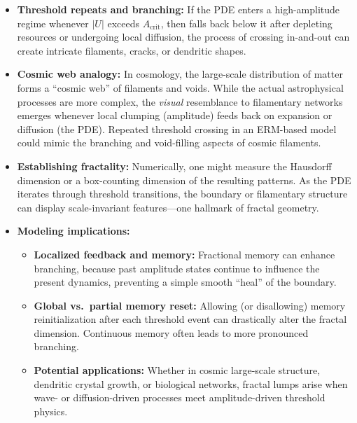 \documentclass[12pt]{article}
\begin{document}
\begin{itemize}
    \item \textbf{Threshold repeats and branching:}
    If the PDE enters a high-amplitude regime whenever $|U|$ exceeds 
    $A_{\mathrm{crit}}$, then falls back below it after depleting resources 
    or undergoing local diffusion, the process of crossing in-and-out can 
    create intricate filaments, cracks, or dendritic shapes.

    \item \textbf{Cosmic web analogy:}
    In cosmology, the large-scale distribution of matter forms a “cosmic web” 
    of filaments and voids. While the actual astrophysical processes are more 
    complex, the \emph{visual} resemblance to filamentary networks emerges 
    whenever local clumping (amplitude) feeds back on expansion or diffusion 
    (the PDE). Repeated threshold crossing in an ERM-based model could mimic 
    the branching and void-filling aspects of cosmic filaments.

    \item \textbf{Establishing fractality:}
    Numerically, one might measure the Hausdorff dimension or a box-counting 
    dimension of the resulting patterns. As the PDE iterates through threshold 
    transitions, the boundary or filamentary structure can display scale-invariant 
    features—one hallmark of fractal geometry. 

    \item \textbf{Modeling implications:}
    \begin{itemize}
        \item \textbf{Localized feedback and memory:}
              Fractional memory can enhance branching, because past 
              amplitude states continue to influence the present 
              dynamics, preventing a simple smooth “heal” of the boundary.
        \item \textbf{Global vs.\ partial memory reset:}
              Allowing (or disallowing) memory reinitialization after each 
              threshold event can drastically alter the fractal dimension. 
              Continuous memory often leads to more pronounced branching.
        \item \textbf{Potential applications:}
              Whether in cosmic large-scale structure, dendritic crystal 
              growth, or biological networks, fractal lumps arise when 
              wave- or diffusion-driven processes meet amplitude-driven 
              threshold physics.
    \end{itemize}
\end{itemize}
\end{document}
